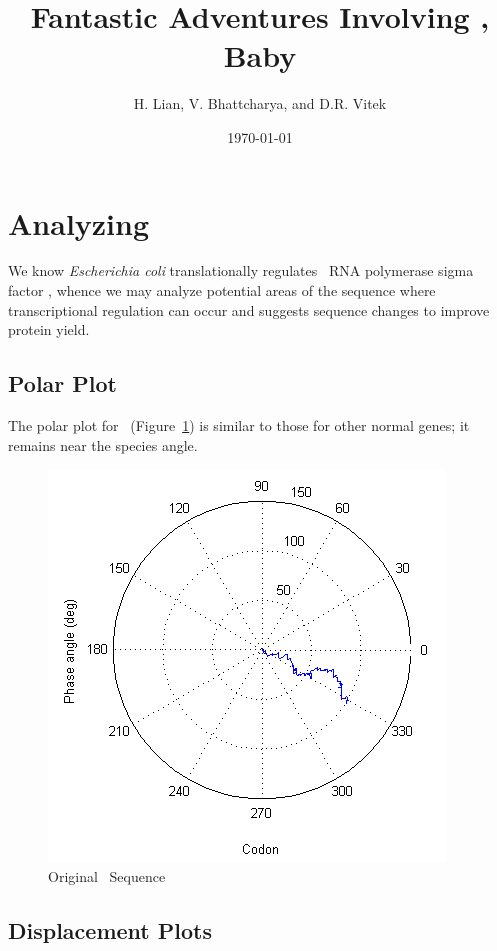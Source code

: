 \documentclass[10pt,twocolumn]{article}
\begin{document}
\title{{\bf Fantastic Adventures Involving \rpoS, Baby}}
\author{{\sc H. Lian, V. Bhattcharya, and D.R. Vitek}}
\date{{\sc \today}}
\maketitle

\section{Analyzing \rpoS}

We know {\it Escherichia coli} translationally regulates~\cite{rpos:process} RNA polymerase sigma factor \rpoS,
whence we may analyze potential areas of the sequence where transcriptional regulation can occur and
suggests sequence changes to improve protein yield.

\subsection{Polar Plot}

The polar plot for \rpoS\ (Figure~\ref{rpos:polar}) is similar to those for other normal genes; 
it remains near the species angle.

\begin{figure}[htp]
    \centering
    \caption{Original \rpoS\ Sequence}
    \label{rpos:polar}
    \includegraphics[scale=0.7]{rpoS/polar.png}
\end{figure}

\subsection{Displacement Plots}
\end{document}
